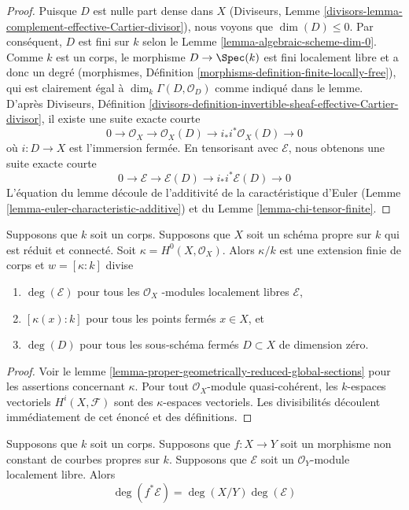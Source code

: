 \begin{proof}
Puisque $D$ est nulle part dense dans $X$ (Diviseurs,
Lemme
\ref{divisors-lemma-complement-effective-Cartier-divisor}),
nous voyons que $\dim(D) \leq 0$. Par conséquent, $D$ est
fini sur $k$ selon le Lemme
\ref{lemma-algebraic-scheme-dim-0}. Comme $k$ est un corps,
le morphisme $D \to \Spec(k)$ est fini localement libre et a
donc un degré (morphismes, Définition
\ref{morphisms-definition-finite-locally-free}), qui est clairement
égal à $\dim_k \Gamma(D, \mathcal{O}_D)$ comme indiqué dans le
lemme. D'après Diviseurs, Définition
\ref{divisors-definition-invertible-sheaf-effective-Cartier-divisor}, il existe une suite exacte courte
$$
0 \to \mathcal{O}_X \to \mathcal{O}_X(D) \to i_*i^*\mathcal{O}_X(D) \to 0
$$
où $i : D \to X$ est l'immersion fermée. En tensorisant
avec $\mathcal{E}$, nous obtenons une suite exacte courte
$$
0 \to \mathcal{E} \to \mathcal{E}(D) \to i_*i^*\mathcal{E}(D) \to 0
$$
L'équation du lemme découle de l'additivité de la
caractéristique d'Euler (Lemme
\ref{lemma-euler-characteristic-additive}) et du Lemme \ref{lemma-chi-tensor-finite}.
\end{proof}

\begin{lemma}
\label{lemma-divisible}
Supposons que $k$ soit un corps. Supposons que $X$ soit
un schéma propre sur $k$ qui est réduit et connecté. Soit
$\kappa = H^0(X, \mathcal{O}_X)$. Alors $\kappa/k$ est
une extension finie de corps et $w = [\kappa : k]$ divise
\begin{enumerate}
\item $\deg(\mathcal{E})$ pour tous les
$\mathcal{O}_X$ -modules localement libres
$\mathcal{E}$, \item $[\kappa(x) : k]$ pour tous les
points fermés $x \in X$, et \item $\deg(D)$ pour tous
les sous-schéma fermés $D \subset X$ de dimension zéro.
\end{enumerate}
\end{lemma}

\begin{proof}
Voir le lemme
\ref{lemma-proper-geometrically-reduced-global-sections} pour
les assertions concernant $\kappa$. Pour tout
$\mathcal{O}_X$-module quasi-cohérent, les $k$-espaces vectoriels
$H^i(X, \mathcal{F})$ sont des $\kappa$-espaces vectoriels. Les
divisibilités découlent immédiatement de cet énoncé et des définitions.
\end{proof}

\begin{lemma}
\label{lemma-degree-pullback-map-proper-curves}
Supposons que $k$ soit un corps. Supposons que $f : X \to Y$ soit
un morphisme non constant de courbes propres sur $k$. Supposons que
$\mathcal{E}$ soit un $\mathcal{O}_Y$-module localement libre. Alors
$$
\deg(f^*\mathcal{E}) = \deg(X/Y) \deg(\mathcal{E})
$$
\end{lemma}


